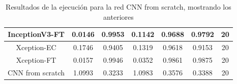 \documentclass[11pt,a4paper]{article}
\theoremstyle{definition}
\begin{document}
\begin{table}[H]
\begin{tabular}{|c|c|c|c|c|c|c|}
\hline
InceptionV3-FT                                      & \textcolor[rgb]{0.129,0.129,0.129}{0.0146 } & \textcolor[rgb]{0.129,0.129,0.129}{0.9953 } & \textcolor[rgb]{0.129,0.129,0.129}{0.1142 }                                                                       & \textcolor[rgb]{0.129,0.129,0.129}{0.9688}                                                                             & \textcolor[rgb]{0.129,0.129,0.129}{0.9792}                                                                       & 20                                                                                                              \\
\hline
Xception-EC                                            & \textcolor[rgb]{0.129,0.129,0.129}{0.1746 } & \textcolor[rgb]{0.129,0.129,0.129}{0.9405 } & \textcolor[rgb]{0.129,0.129,0.129}{0.1319 }                                                                       & \textcolor[rgb]{0.129,0.129,0.129}{0.9618}                                                                             & \textcolor[rgb]{0.129,0.129,0.129}{0.9153}                                                                       & 20                                                                                                              \\
\hline
Xception-FT                        & \textcolor[rgb]{0.129,0.129,0.129}{0.0157 } & \textcolor[rgb]{0.129,0.129,0.129}{0.9946 } & \textcolor[rgb]{0.129,0.129,0.129}{0.0352 }                                                                       & \textcolor[rgb]{0.129,0.129,0.129}{0.9861}                                                                             & \textcolor[rgb]{0.129,0.129,0.129}{0.9875}                                                                       & 20                                                                                                              \\
\hline
\rowcolor{green} CNN from scratch                        & \textcolor[rgb]{0.129,0.129,0.129}{1.0993  } & \textcolor[rgb]{0.129,0.129,0.129}{0.3233  } & \textcolor[rgb]{0.129,0.129,0.129}{1.0983 }                                                                       & \textcolor[rgb]{0.129,0.129,0.129}{0.3576}                                                                             & \textcolor[rgb]{0.129,0.129,0.129}{0.3388}                                                                       & 20                                                                                                              \\
\hline
\end{tabular}
\caption{Resultados de la ejecución para la red CNN from scratch, mostrando los anteriores}

\end{table}
\end{document}
